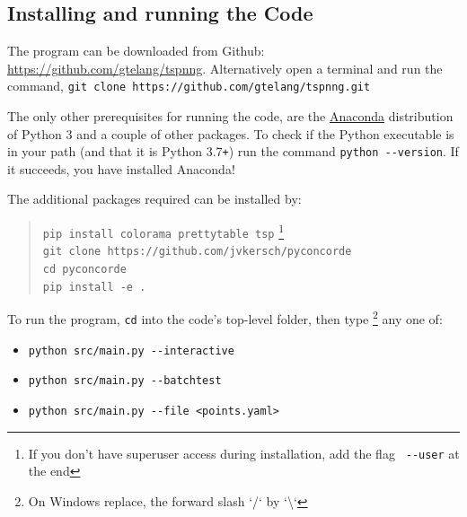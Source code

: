 \begin{appendices}
\newpage

\newpage
\section{Installing and running the Code}
\label{sec:install}

The program can be downloaded from Github: \url{https://github.com/gtelang/tspnng}. Alternatively
open a terminal and run the command, \texttt{git clone https://github.com/gtelang/tspnng.git}

The only other prerequisites for running the code, are the 
\href{https://www.anaconda.com/products/individual}{Anaconda} distribution of Python 3 
and a couple of other packages.  To check if the Python executable is in your path (and that it is Python 3.7\texttt{+}) 
run the command \verb|python --version|. If it succeeds, you have installed Anaconda! 

The additional packages required can be installed by: 

\begin{quote}
\color{blue}
\texttt{pip install colorama prettytable tsp} \footnote{If you don't have superuser access during installation, add the flag \texttt{\color{red} \texttt{-{}-}user} at the end}   \\
\texttt{git clone https://github.com/jvkersch/pyconcorde} \\
\texttt{cd pyconcorde}\\
\texttt{pip install -e .}
\end{quote}


To run the program, \texttt{cd} into the code's top-level folder, then type \footnote{On Windows replace, the forward slash `/` by `\textbackslash`}
any one of: 

\begin{itemize}
\item \verb|python src/main.py --interactive|
\item \verb|python src/main.py --batchtest|
\item \verb|python src/main.py --file <points.yaml>|
\end{itemize}




\end{appendices}
